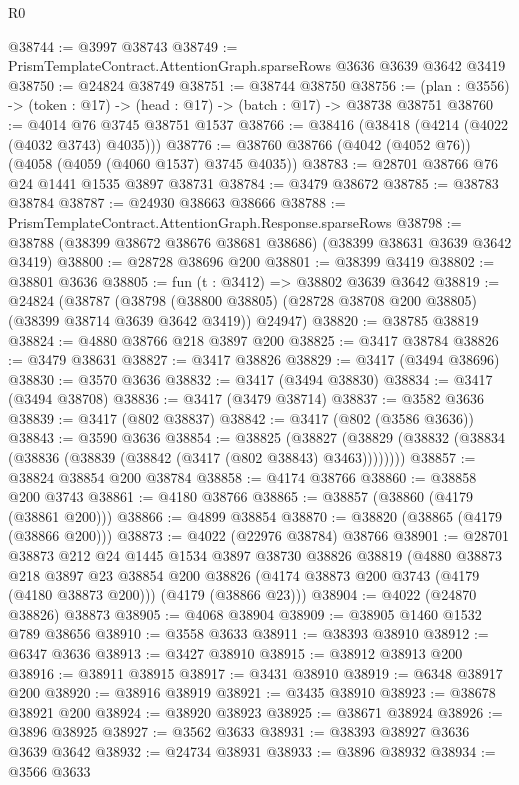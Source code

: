 \begin{lexlean}{R0}
\begin{coremodule}
@38744 := @3997 @38743
@38749 := PrismTemplateContract.AttentionGraph.sparseRows @3636 @3639 @3642 @3419
@38750 := @24824 @38749
@38751 := @38744 @38750
@38756 := (plan : @3556) -> (token : @17) -> (head : @17) -> (batch : @17) -> @38738 @38751
@38760 := @4014 @76 @3745 @38751 @1537
@38766 := @38416 (@38418 (@4214 (@4022 (@4032 @3743) @4035)))
@38776 := @38760 @38766 (@4042 (@4052 @76)) (@4058 (@4059 (@4060 @1537) @3745 @4035))
@38783 := @28701 @38766 @76 @24 @1441 @1535 @3897 @38731
@38784 := @3479 @38672
@38785 := @38783 @38784
@38787 := @24930 @38663 @38666
@38788 := PrismTemplateContract.AttentionGraph.Response.sparseRows
@38798 := @38788 (@38399 @38672 @38676 @38681 @38686) (@38399 @38631 @3639 @3642 @3419)
@38800 := @28728 @38696 @200
@38801 := @38399 @3419
@38802 := @38801 @3636
@38805 := fun (t : @3412) => @38802 @3639 @3642
@38819 := @24824
    (@38787
      (@38798 (@38800 @38805) (@28728 @38708 @200 @38805) (@38399 @38714 @3639 @3642 @3419))
      @24947)
@38820 := @38785 @38819
@38824 := @4880 @38766 @218 @3897 @200
@38825 := @3417 @38784
@38826 := @3479 @38631
@38827 := @3417 @38826
@38829 := @3417 (@3494 @38696)
@38830 := @3570 @3636
@38832 := @3417 (@3494 @38830)
@38834 := @3417 (@3494 @38708)
@38836 := @3417 (@3479 @38714)
@38837 := @3582 @3636
@38839 := @3417 (@802 @38837)
@38842 := @3417 (@802 (@3586 @3636))
@38843 := @3590 @3636
@38854 := @38825
    (@38827 (@38829 (@38832 (@38834 (@38836 (@38839 (@38842 (@3417 (@802 @38843) @3463))))))))
@38857 := @38824 @38854 @200 @38784
@38858 := @4174 @38766
@38860 := @38858 @200 @3743
@38861 := @4180 @38766
@38865 := @38857 (@38860 (@4179 (@38861 @200)))
@38866 := @4899 @38854
@38870 := @38820 (@38865 (@4179 (@38866 @200)))
@38873 := @4022 (@22976 @38784) @38766
@38901 := @28701
    @38873
    @212
    @24
    @1445
    @1534
    @3897
    @38730
    @38826
    @38819
    (@4880
      @38873
      @218
      @3897
      @23
      @38854
      @200
      @38826
      (@4174 @38873 @200 @3743 (@4179 (@4180 @38873 @200)))
      (@4179 (@38866 @23)))
@38904 := @4022 (@24870 @38826) @38873
@38905 := @4068 @38904
@38909 := @38905 @1460 @1532 @789 @38656
@38910 := @3558 @3633
@38911 := @38393 @38910
@38912 := @6347 @3636
@38913 := @3427 @38910
@38915 := @38912 @38913 @200
@38916 := @38911 @38915
@38917 := @3431 @38910
@38919 := @6348 @38917 @200
@38920 := @38916 @38919
@38921 := @3435 @38910
@38923 := @38678 @38921 @200
@38924 := @38920 @38923
@38925 := @38671 @38924
@38926 := @3896 @38925
@38927 := @3562 @3633
@38931 := @38393 @38927 @3636 @3639 @3642
@38932 := @24734 @38931
@38933 := @3896 @38932
@38934 := @3566 @3633

\end{coremodule}
\end{lexlean}
